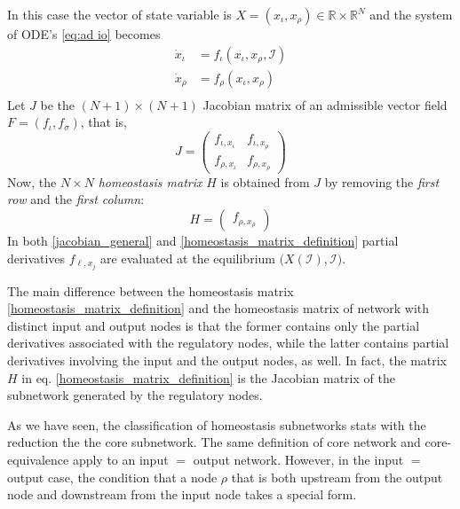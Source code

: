 \documentclass[pdflatex,sn-basic,Numbered]{sn-jnl}
\theoremstyle{thmstyleone}%
\numberwithin{equation}{section}
\begin{document}
In this case the vector of state variable is $X=(x_{\iota},x_{\rho})\in\mathbb{R}\times\mathbb{R}^N$ and the system of ODE's \eqref{eq:ad io} becomes
\begin{equation}  \label{admissible_systems_ODE_IO}
\begin{aligned}
\dot{x}_{\iota} & = f_{\iota}(x_{\iota}, x_{\rho}, \mathcal{I}) \\
\dot{x}_{\rho} & = f_{\rho}(x_{\iota}, x_{\rho})\\
\end{aligned}
\end{equation}
Let $J$ be the $(N+1)\times (N+1)$ Jacobian matrix of an admissible vector field $F=(f_{\iota},f_{\sigma})$, that is,
\begin{equation} \label{jacobian_general}
J = \begin{pmatrix}
  f_{\iota, x_{\iota}}   &  f_{\iota, x_\rho} \\
  f_{\rho, x_{\iota}}   &  f_{\rho, x_\rho} 
\end{pmatrix}
\end{equation}
Now, the $N\times N$ \emph{homeostasis matrix} $H$ is obtained from $J$ by removing the \emph{first row} and the \emph{first column}:
\begin{equation}
\label{homeostasis_matrix_definition}
H = 
\begin{pmatrix}
f_{\rho, x_\rho}
\end{pmatrix}
\end{equation}
In both \eqref{jacobian_general} and \eqref{homeostasis_matrix_definition} partial derivatives $f_{\ell,x_j}$ are evaluated at the equilibrium $\big(X(\mathcal{I}),\mathcal{I}\big)$.

The main difference between the homeostasis matrix \eqref{homeostasis_matrix_definition} and the homeostasis matrix of network with distinct input and output nodes is that the former contains only the partial derivatives associated with the regulatory nodes, while the latter contains partial derivatives involving the input and the output nodes, as well.
In fact, the matrix $H$ in eq. \eqref{homeostasis_matrix_definition} is the Jacobian matrix of the subnetwork generated by the regulatory nodes.

As we have seen, the classification of homeostasis subnetworks stats with the reduction the the core subnetwork. 
The same definition of core network and core-equivalence apply to an input $=$ output network.
However, in the input $=$ output case, the condition that a node $\rho$ that is both upstream from the output node and downstream from the input node takes a special form.
\end{document}
